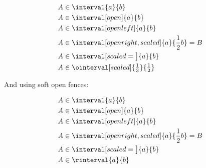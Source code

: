 \documentclass[a4paper,article]{memoir}
\begin{document}
\begin{LTXexample}[varwidth=true]
\begin{align*}
& A\in\interval{a}{b}              \\
& A\in\interval[open]{a}{b}        \\
& A\in\interval[open left]{a}{b}   \\      
& A\in\interval[open right,
  scaled]{a}{\frac{1}{2}b}=B       \\     
& A\in\interval[scaled=\big]{a}{b} \\
& A\in\ointerval[scaled]{%
  \tfrac{1}{3}}{\tfrac{1}{2}}
\end{align*}
\end{LTXexample}
And using soft open fences:
\begin{LTXexample}[varwidth=true]
\begin{align*}
& A\in\interval{a}{b}              \\
& A\in\interval[open]{a}{b}        \\
& A\in\interval[open left]{a}{b}   \\      
& A\in\interval[open right,
  scaled]{a}{\frac{1}{2}b}=B       \\     
& A\in\interval[scaled=\big]{a}{b} \\
& A\in\rinterval{a}{b}
\end{align*}
\end{LTXexample}
\end{document}
